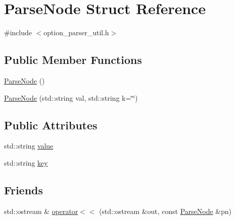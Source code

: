 \hypertarget{structParseNode}{\section{Parse\-Node Struct Reference}
\label{structParseNode}
}


{\ttfamily \#include $<$option\-\_\-parser\-\_\-util.\-h$>$}

\subsection*{Public Member Functions}
\begin{DoxyCompactItemize}
\item 
\hyperlink{structParseNode_a39b27a1c2c12e00ad8fd5152d6dadcf1}{Parse\-Node} ()
\item 
\hyperlink{structParseNode_a4fe465fcffd6eaa4cc04cbc8e27d6d5e}{Parse\-Node} (std\-::string val, std\-::string k=\char`\"{}\char`\"{})
\end{DoxyCompactItemize}
\subsection*{Public Attributes}
\begin{DoxyCompactItemize}
\item 
std\-::string \hyperlink{structParseNode_af848fb0386f5fa61625511f15382090a}{value}
\item 
std\-::string \hyperlink{structParseNode_a5aae5029919c06eeb77291728e4adfe0}{key}
\end{DoxyCompactItemize}
\subsection*{Friends}
\begin{DoxyCompactItemize}
\item 
std\-::ostream \& \hyperlink{structParseNode_a7042847a209e7b92c752a7994c75a7e9}{operator$<$$<$} (std\-::ostream \&out, const \hyperlink{structParseNode}{Parse\-Node} \&pn)
\end{DoxyCompactItemize}


